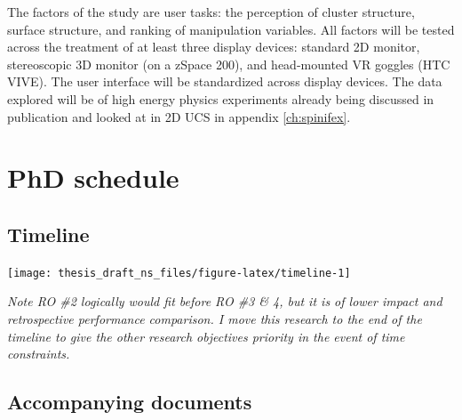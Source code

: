 \documentclass{monashthesis}
\begin{document}
The factors of the study are user tasks: the perception of cluster structure, surface structure, and ranking of manipulation variables. All factors will be tested across the treatment of at least three display devices: standard 2D monitor, stereoscopic 3D monitor (on a zSpace 200), and head-mounted VR goggles (HTC VIVE). The user interface will be standardized across display devices. The data explored will be of high energy physics experiments already being discussed in publication \autocite{wang_visualizing_2018,cook_dynamical_2018} and looked at in 2D UCS in appendix \ref{ch:spinifex}.

\hypertarget{ch:timeline}{%
\chapter{PhD schedule}\label{ch:timeline}}

\hypertarget{timeline}{%
\section{Timeline}\label{timeline}}

\begin{center}\texttt{[image: thesis\_draft\_ns\_files/figure-latex/timeline-1]} \end{center}

\emph{Note RO \#2 logically would fit before RO \#3 \& 4, but it is of lower impact and retrospective performance comparison. I move this research to the end of the timeline to give the other research objectives priority in the event of time constraints.}

\hypertarget{accompanying-documents}{%
\section{Accompanying documents}\label{accompanying-documents}}
\end{document}
